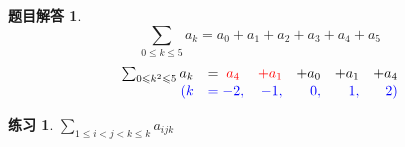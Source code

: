 \documentclass[mode=geye, chinesefont=founder]{elegantnote}
\newtheorem{exercise}{练习}
\newtheorem{answer}{题目解答}
\begin{document}
\begin{answer}
    \begin{equation*}
        \sum_{0\leqslant k\leqslant 5}a_k = a_0+a_1+a_2+a_3+a_4+a_5
    \end{equation*}
    \begin{equation*}
        \begin{array}{rlrrrr}
            \sum_{0\leqslant k^2\leqslant 5}a_k 
            &= {\color{red} \;a_4}&{\color{red}+a_1}&+a_0&+a_1&+a_4 \\
            {\color{blue}(k}&{\color{blue}= -2,} &{\color{blue}-1,} &{\color{blue}0, }&{\color{blue}1, }&{\color{blue}2)}\\
        \end{array}
    \end{equation*}
\end{answer}

\begin{exercise}
    $ \sum_{1\leqslant i< j<k\leqslant k} a_{ijk}$ 
\end{exercise}
\end{document}
